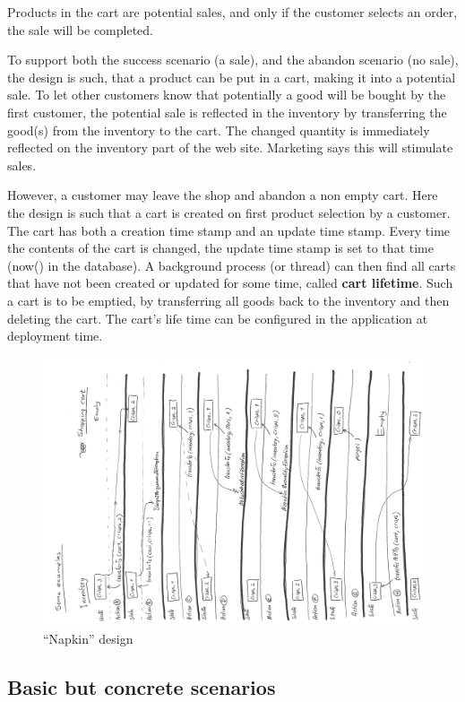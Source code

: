 Products in the cart are potential sales, and only if the
customer selects an order, the sale will be completed.

To support both the success scenario (a sale), and the abandon
scenario (no sale), the design is such, that a product can be put in a
cart, making it 
into a potential sale. To let other customers know that
potentially a good will be bought by the first customer, the
potential sale is reflected in the inventory by transferring the
good(s) from the inventory to the cart. The changed quantity is
immediately reflected on the inventory part of the web site. Marketing
says this will stimulate sales. 

However, a customer may leave the shop and abandon a non empty cart.
Here the design is such that a cart is created on first product
selection by a customer. The cart has both a creation time stamp and
an update time stamp. Every time the contents of the cart is changed,
the update time stamp is set to that time (now() in the database).
A background process (or thread) can then find all carts that have not
been created or updated for some time, called \textbf{cart lifetime}.
Such a cart is to be emptied, by transferring all goods back to the 
inventory and then deleting the cart.
The cart's life time can be configured in the application at deployment time. 

\begin{figure}
  \centering
  \includegraphics[angle=-90,width=.9\linewidth]{figures/assessment_napkin}
  \caption{\label{fig:napkin} ``Napkin'' design }
\end{figure}
\clearpage

\subsection{Basic but concrete scenarios}

